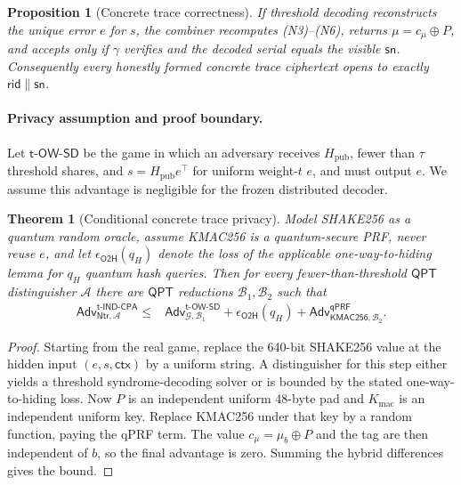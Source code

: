 \documentclass[11pt]{article}
\newtheorem{theorem}[definition]{Theorem}
\newtheorem{proposition}[definition]{Proposition}
\newcommand{\Adv}{\mathsf{Adv}}
\newcommand{\QPT}{\mathsf{QPT}}
\newcommand{\rid}{\mathsf{rid}}
\newcommand{\sn}{\mathsf{sn}}
\newcommand{\ctx}{\mathsf{ctx}}
\begin{document}
\begin{proposition}[Concrete trace correctness]\label{prop:ntr-correct}
If threshold decoding reconstructs the unique error $e$ for $s$, the combiner
recomputes (N3)--(N6), returns $\mu=c_\mu\oplus P$, and accepts only if
$\gamma$ verifies and the decoded serial equals the visible $\sn$.
Consequently every honestly formed concrete trace ciphertext opens to exactly
$\rid\|\sn$.
\end{proposition}

\paragraph{Privacy assumption and proof boundary.}
Let $\mathsf{t\text{-}OW\text{-}SD}$ be the game in which an adversary receives
$H_{\mathrm{pub}}$, fewer than $\tau$ threshold shares, and
$s=H_{\mathrm{pub}}e^\top$ for uniform weight-$t$ $e$, and must output $e$.
We assume this advantage is negligible for the frozen distributed decoder.

\begin{theorem}[Conditional concrete trace privacy]\label{thm:ntr-privacy}
Model SHAKE256 as a quantum random oracle, assume KMAC256 is a quantum-secure
PRF, never reuse $e$, and let $\epsilon_{\mathsf{O2H}}(q_H)$ denote the loss of
the applicable one-way-to-hiding lemma for $q_H$ quantum hash queries.  Then for
every fewer-than-threshold $\QPT$ distinguisher $\mathcal A$ there are $\QPT$
reductions $\mathcal B_1,\mathcal B_2$ such that
\begin{align*}
 \Adv^{\mathsf{t\text{-}IND\text{-}CPA}}_{\mathsf{Ntr},\mathcal A}
 \leq{}&
 \Adv^{\mathsf{t\text{-}OW\text{-}SD}}_{\mathcal G,\mathcal B_1}
 +\epsilon_{\mathsf{O2H}}(q_H)
 +\Adv^{\mathsf{qPRF}}_{\mathsf{KMAC256},\mathcal B_2}.
\end{align*}
\end{theorem}

\begin{proof}
Starting from the real game, replace the 640-bit SHAKE256 value at the hidden
input $(e,s,\ctx)$ by a uniform string.  A distinguisher for this step
either yields a threshold syndrome-decoding solver or is bounded by the stated
one-way-to-hiding loss.  Now $P$ is an independent uniform 48-byte pad and
$K_{\mathrm{mac}}$ is an independent uniform key.  Replace KMAC256 under that
key by a random function, paying the qPRF term.  The value
$c_\mu=\mu_b\oplus P$ and the tag are then independent of $b$, so the final
advantage is zero.  Summing the hybrid differences gives the bound.
\end{proof}
\end{document}

